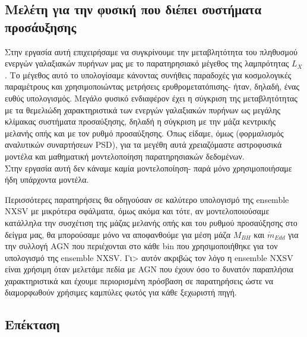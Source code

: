 \subsection*{Μελέτη για την φυσική που διέπει συστήματα προσάυξησης}

Στην εργασία αυτή επιχειρήσαμε να συγκρίνουμε την μεταβλητότητα του πληθυσμού ενεργών γαλαξιακών πυρήνων μας με το παρατηρησιακό μέγεθος της λαμπρότητας $L_X$. Το μέγεθος αυτό το υπολογίσαμε κάνοντας συνήθεις παραδοχές για κοσμολογικές παραμέτρους και χρησιμοποιώντας μετρήσεις ερυθρομετατόπισης- ήταν, δηλαδή, ένας ευθύς υπολογισμός. Μεγάλο φυσικό ενδιαφέρον έχει η σύγκριση της μεταβλητότητας με τα θεμελιώδη χαρακτηριστικά των ενεργών γαλαξιακών πυρήνων ως μεγάλης κλίμακας συστήματα προσαύξησης, δηλαδή η σύγκριση με την μάζα κεντρικής μελανής οπής και με τον ρυθμό προσαύξησης. Όπως είδαμε, όμως (φορμαλισμός αναλυτικών συναρτήσεων \textlatin{PSD}), για τα μεγέθη αυτά χρειαζόμαστε αστροφυσικά μοντέλα και μαθηματική μοντελοποίηση παρατηρησιακών δεδομένων. \\
Στην εργασία αυτή δεν κάναμε καμία μοντελοποίηση- παρά μόνο χρησιμοποιήσαμε ήδη υπάρχοντα μοντέλα.

Περισσότερες παρατηρήσεις θα οδηγούσαν σε καλύτερο υπολογισμό της \textlatin{ensemble NXSV} με μικρότερα σφάλματα, όμως ακόμα και τότε, αν μοντελοποιούσαμε κατάλληλα την συσχέτιση της μάζας μελανής οπής και του ρυθμού προσαύξησης στο δείγμα μας, θα μπορούσαμε μόνο να αποφανθούμε για μέση μάζα $Μ_{BH}$ και $\dot m _{Edd}$ για την συλλογή \textlatin{AGN} που περιέχονται στο κάθε \textlatin{bin} που χρησιμοποιήθηκε για τον υπολογισμό της \textlatin{ensemble NXSV}. Γι> αυτόν ακριβώς τον λόγο η \textlatin{ensemble NXSV} είναι χρήσιμη όταν μελετάμε πεδία με \textlatin{AGN} που έχουν όσο το δυνατόν παραπλήσια χαρακτηριστικά και έχουμε περιορισμένη πρόσβαση σε παρατηρήσεις ώστε να διαμορφωθούν χρήσιμες καμπύλες φωτός για κάθε ξεχωριστή πηγή.

\subsection*{Επέκταση}

